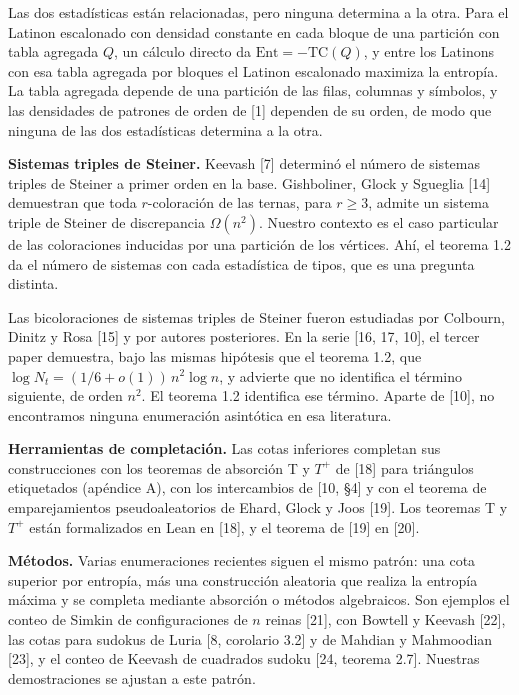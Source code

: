\documentclass[spanish,11pt,a4paper]{article}
\begin{document}
Las dos estadísticas están relacionadas, pero ninguna determina a la otra. Para el Latinon escalonado con densidad constante en cada bloque de una partición con tabla agregada \(Q\), un cálculo directo da \(\mathrm{Ent}=-\mathrm{TC}(Q)\), y entre los Latinons con esa tabla agregada por bloques el Latinon escalonado maximiza la entropía. La tabla agregada depende de una partición de las filas, columnas y símbolos, y las densidades de patrones de orden de {[}1{]} dependen de su orden, de modo que ninguna de las dos estadísticas determina a la otra.

\textbf{Sistemas triples de Steiner.} Keevash {[}7{]} determinó el número de sistemas triples de Steiner a primer orden en la base. Gishboliner, Glock y Sgueglia {[}14{]} demuestran que toda \(r\)-coloración de las ternas, para \(r\ge3\), admite un sistema triple de Steiner de discrepancia \(\Omega(n^2)\). Nuestro contexto es el caso particular de las coloraciones inducidas por una partición de los vértices. Ahí, el teorema 1.2 da el número de sistemas con cada estadística de tipos, que es una pregunta distinta.

Las bicoloraciones de sistemas triples de Steiner fueron estudiadas por Colbourn, Dinitz y Rosa {[}15{]} y por autores posteriores. En la serie {[}16, 17, 10{]}, el tercer paper demuestra, bajo las mismas hipótesis que el teorema 1.2, que \(\log N_t=(1/6+o(1))\,n^2\log n\), y advierte que no identifica el término siguiente, de orden \(n^2\). El teorema 1.2 identifica ese término. Aparte de {[}10{]}, no encontramos ninguna enumeración asintótica en esa literatura.

\textbf{Herramientas de completación.} Las cotas inferiores completan sus construcciones con los teoremas de absorción T y \(T^+\) de {[}18{]} para triángulos etiquetados (apéndice A), con los intercambios de {[}10, §4{]} y con el teorema de emparejamientos pseudoaleatorios de Ehard, Glock y Joos {[}19{]}. Los teoremas T y \(T^+\) están formalizados en Lean en {[}18{]}, y el teorema de {[}19{]} en {[}20{]}.

\textbf{Métodos.} Varias enumeraciones recientes siguen el mismo patrón: una cota superior por entropía, más una construcción aleatoria que realiza la entropía máxima y se completa mediante absorción o métodos algebraicos. Son ejemplos el conteo de Simkin de configuraciones de \(n\) reinas {[}21{]}, con Bowtell y Keevash {[}22{]}, las cotas para sudokus de Luria {[}8, corolario 3.2{]} y de Mahdian y Mahmoodian {[}23{]}, y el conteo de Keevash de cuadrados sudoku {[}24, teorema 2.7{]}. Nuestras demostraciones se ajustan a este patrón.
\end{document}

